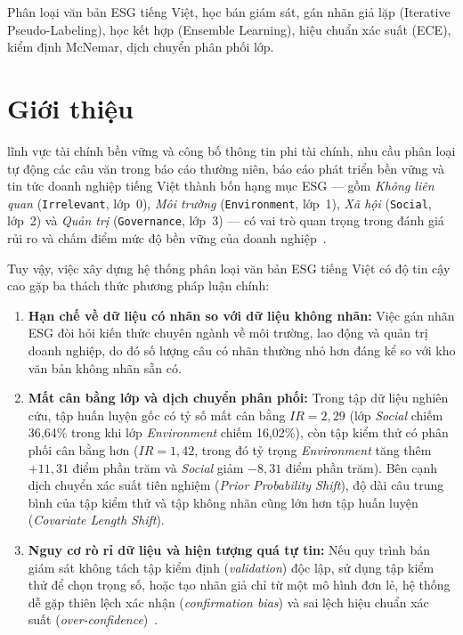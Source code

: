 \documentclass[journal,a4paper]{IEEEtran}
\newcommand{\code}[1]{\texttt{\small #1}}
\begin{document}
\begin{IEEEkeywords}
Phân loại văn bản ESG tiếng Việt, học bán giám sát, gán nhãn giả lặp (Iterative Pseudo-Labeling), học kết hợp (Ensemble Learning), hiệu chuẩn xác suất (ECE), kiểm định McNemar, dịch chuyển phân phối lớp.
\end{IEEEkeywords}

\IEEEpeerreviewmaketitle

\section{Giới thiệu}
\label{sec:intro}

 lĩnh vực tài chính bền vững và công bố thông tin phi tài chính, nhu cầu phân loại tự động các câu văn trong báo cáo thường niên, báo cáo phát triển bền vững và tin tức doanh nghiệp tiếng Việt thành bốn hạng mục ESG --- gồm \textit{Không liên quan} (\code{Irrelevant}, lớp~0), \textit{Môi trường} (\code{Environment}, lớp~1), \textit{Xã hội} (\code{Social}, lớp~2) và \textit{Quản trị} (\code{Governance}, lớp~3) --- có vai trò quan trọng trong đánh giá rủi ro và chấm điểm mức độ bền vững của doanh nghiệp~\cite{huang2023finbert}.

Tuy vậy, việc xây dựng hệ thống phân loại văn bản ESG tiếng Việt có độ tin cậy cao gặp ba thách thức phương pháp luận chính:
\begin{enumerate}[leftmargin=*, itemsep=2pt, topsep=2pt]
  \item \textbf{Hạn chế về dữ liệu có nhãn so với dữ liệu không nhãn:} Việc gán nhãn ESG đòi hỏi kiến thức chuyên ngành về môi trường, lao động và quản trị doanh nghiệp, do đó số lượng câu có nhãn thường nhỏ hơn đáng kể so với kho văn bản không nhãn sẵn có.
  \item \textbf{Mất cân bằng lớp và dịch chuyển phân phối:} Trong tập dữ liệu nghiên cứu, tập huấn luyện gốc có tỷ số mất cân bằng $IR = 2{,}29$ (lớp \textit{Social} chiếm 36,64\% trong khi lớp \textit{Environment} chiếm 16,02\%), còn tập kiểm thử có phân phối cân bằng hơn ($IR = 1{,}42$, trong đó tỷ trọng \textit{Environment} tăng thêm $+11{,}31$ điểm phần trăm và \textit{Social} giảm $-8{,}31$ điểm phần trăm). Bên cạnh dịch chuyển xác suất tiên nghiệm (\textit{Prior Probability Shift}), độ dài câu trung bình của tập kiểm thử và tập không nhãn cũng lớn hơn tập huấn luyện (\textit{Covariate Length Shift}).
  \item \textbf{Nguy cơ rò rỉ dữ liệu và hiện tượng quá tự tin:} Nếu quy trình bán giám sát không tách tập kiểm định (\textit{validation}) độc lập, sử dụng tập kiểm thử để chọn trọng số, hoặc tạo nhãn giả chỉ từ một mô hình đơn lẻ, hệ thống dễ gặp thiên lệch xác nhận (\textit{confirmation bias}) và sai lệch hiệu chuẩn xác suất (\textit{over-confidence})~\cite{guo2017calibration}.
\end{enumerate}
\end{document}
